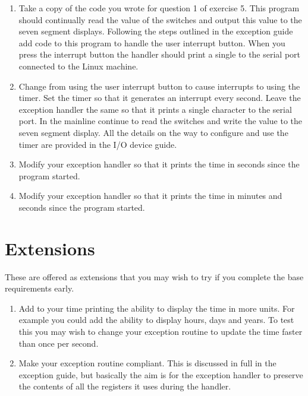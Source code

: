 \documentclass[a4paper,10pt]{article}
\begin{document}
\begin{enumerate}
\item

Take a copy of the code you wrote for question 1 of exercise 5. This
program should continually read the value of the switches and output
this value to the seven segment displays. Following the steps outlined
in the exception guide add code to this program to handle the user
interrupt button. When you press the interrupt button the handler should print
a single  to the serial port connected to the Linux machine.

\item 

Change from using the user interrupt button to cause interrupts to
using the timer. Set the timer so that it generates an interrupt every
second.  Leave the exception handler the same so that it prints a
single character to the serial port. In the mainline continue to read
the switches and write the value to the seven segment display. All the
details on the way to configure and use the timer are provided in the
I/O device guide.

\item 

Modify your exception handler so that it prints the time in seconds
since the program started.

\item 

Modify your exception handler so that it prints the time in minutes and seconds
since the program started.

\label{ques:final}
\end{enumerate}

\section{Extensions}

These are offered as extensions that you may wish to try if you
complete the base requirements early.

\begin{enumerate}

\item

Add to your time printing the ability to display the time in more
units. For example you could add the ability to display hours, days
and years. To test this you may wish to change your exception routine
to update the time faster than once per second.

\item

Make your exception routine compliant. This is discussed in full in
the exception guide, but basically the aim is for the exception
handler to preserve the contents of all the registers it uses during
the handler.

\end{enumerate}

\thispagestyle{rcsfooters}
\pagestyle{rcsfooters}
\end{document}
